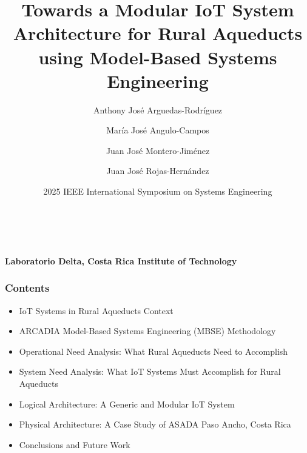 \documentclass{beamer}
\title[IoT for Rural Aqueducts using MBSE]{Towards a Modular IoT System Architecture for Rural Aqueducts using Model-Based Systems Engineering}
\author[Laboratorio Delta]{Anthony José Arguedas-Rodríguez \and María José Angulo-Campos \and Juan José Montero-Jiménez \and Juan José Rojas-Hernández}
\date{2025 IEEE International Symposium on Systems Engineering}
\begin{document}
\begin{frame}
    \begin{center}
        {\LARGE \textbf{\inserttitle}} \\
        \vspace{0.5cm}
        {\insertauthor} \\
        \vspace{0.25cm}
        {\small \textbf{Laboratorio Delta, Costa Rica Institute of Technology}} \\
        \vspace{0.5cm}
        {\insertdate}
    \end{center}
\end{frame}

\begin{frame}
    \frametitle{Contents}
    \begin{itemize}
        \item IoT Systems in Rural Aqueducts Context
        \item ARCADIA Model-Based Systems Engineering (MBSE) Methodology
        \item Operational Need Analysis: What Rural Aqueducts Need to Accomplish
        \item System Need Analysis: What IoT Systems Must Accomplish for Rural Aqueducts
        \item Logical Architecture: A Generic and Modular IoT System
        \item Physical Architecture: A Case Study of ASADA Paso Ancho, Costa Rica
        \item Conclusions and Future Work
    \end{itemize}
\end{frame}
\end{document}
